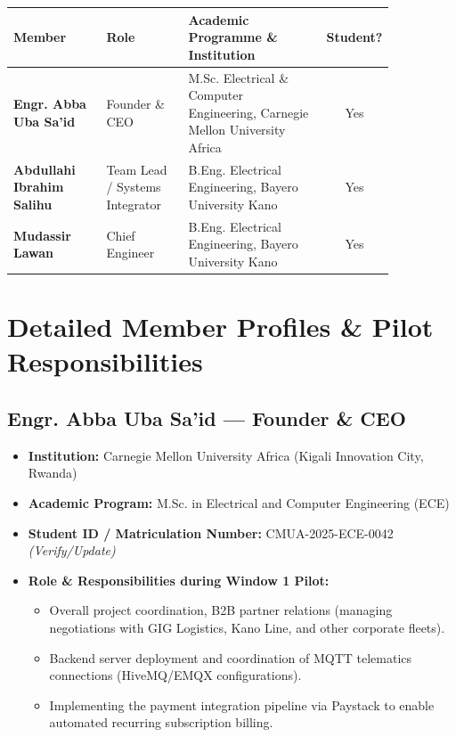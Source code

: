 \documentclass[11pt,a4paper]{article}
\begin{document}
\renewcommand{\arraystretch}{1.3}
\begin{longtable}{p{0.25\linewidth} p{0.22\linewidth} p{0.38\linewidth} c}
    \toprule
    \textbf{Member} & \textbf{Role} & \textbf{Academic Programme \& Institution} & \textbf{Student?} \\
    \midrule
    \textbf{Engr. Abba Uba Sa'id} & Founder \& CEO & M.Sc. Electrical \& Computer Engineering, Carnegie Mellon University Africa & Yes \\
    \textbf{Abdullahi Ibrahim Salihu} & Team Lead / Systems Integrator & B.Eng. Electrical Engineering, Bayero University Kano & Yes \\
    \textbf{Mudassir Lawan} & Chief Engineer & B.Eng. Electrical Engineering, Bayero University Kano & Yes \\
    \bottomrule
\end{longtable}

\vspace{0.3cm}

\section{Detailed Member Profiles \& Pilot Responsibilities}

\subsection{Engr. Abba Uba Sa'id --- Founder \& CEO}
\begin{itemize}
    \item \textbf{Institution:} Carnegie Mellon University Africa (Kigali Innovation City, Rwanda)
    \item \textbf{Academic Program:} M.Sc. in Electrical and Computer Engineering (ECE)
    \item \textbf{Student ID / Matriculation Number:} CMUA-2025-ECE-0042 \textit{(Verify/Update)}
    \item \textbf{Role \& Responsibilities during Window 1 Pilot:}
        \begin{itemize}
            \item Overall project coordination, B2B partner relations (managing negotiations with GIG Logistics, Kano Line, and other corporate fleets).
            \item Backend server deployment and coordination of MQTT telematics connections (HiveMQ/EMQX configurations).
            \item Implementing the payment integration pipeline via Paystack to enable automated recurring subscription billing.
        \end{itemize}
\end{itemize}
\end{document}
